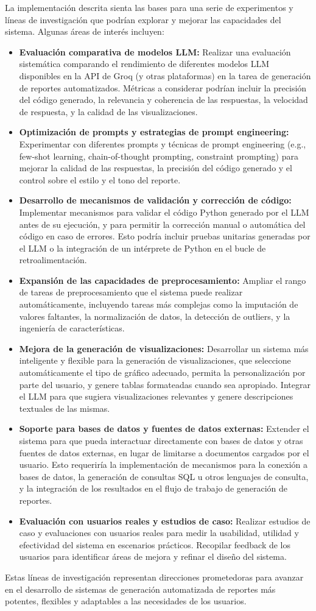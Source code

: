 La implementación descrita sienta las bases para una serie de experimentos y líneas de investigación que podrían explorar y mejorar las capacidades del sistema.  Algunas áreas de interés incluyen:

\begin{itemize}
	\item \textbf{Evaluación comparativa de modelos LLM:}  Realizar una evaluación sistemática comparando el rendimiento de diferentes modelos LLM disponibles en la API de Groq (y otras plataformas) en la tarea de generación de reportes automatizados.  Métricas a considerar podrían incluir la precisión del código generado,  la relevancia y coherencia de las respuestas,  la velocidad de respuesta,  y la calidad de las visualizaciones.
	\item \textbf{Optimización de prompts y estrategias de prompt engineering:}  Experimentar con diferentes prompts y técnicas de prompt engineering (e.g., few-shot learning, chain-of-thought prompting, constraint prompting) para mejorar la calidad de las respuestas,  la precisión del código generado y el control sobre el estilo y el tono del reporte.
	\item \textbf{Desarrollo de mecanismos de validación y corrección de código:}  Implementar mecanismos para validar el código Python generado por el LLM antes de su ejecución,  y para permitir la corrección manual o automática del código en caso de errores.  Esto podría incluir pruebas unitarias generadas por el LLM o la integración de un intérprete de Python en el bucle de retroalimentación.
	\item \textbf{Expansión de las capacidades de preprocesamiento:}  Ampliar el rango de tareas de preprocesamiento que el sistema puede realizar automáticamente,  incluyendo tareas más complejas como la imputación de valores faltantes,  la normalización de datos,  la detección de outliers,  y la ingeniería de características.
	\item \textbf{Mejora de la generación de visualizaciones:}  Desarrollar un sistema más inteligente y flexible para la generación de visualizaciones,  que seleccione automáticamente el tipo de gráfico adecuado,  permita la personalización por parte del usuario,  y genere tablas formateadas cuando sea apropiado.  Integrar el LLM para que sugiera visualizaciones relevantes y genere descripciones textuales de las mismas.
	\item \textbf{Soporte para bases de datos y fuentes de datos externas:}  Extender el sistema para que pueda interactuar directamente con bases de datos y otras fuentes de datos externas,  en lugar de limitarse a documentos cargados por el usuario.  Esto requeriría la implementación de mecanismos para la conexión a bases de datos,  la generación de consultas SQL u otros lenguajes de consulta,  y la integración de los resultados en el flujo de trabajo de generación de reportes.
	\item \textbf{Evaluación con usuarios reales y estudios de caso:}  Realizar estudios de caso y evaluaciones con usuarios reales para medir la usabilidad,  utilidad y efectividad del sistema en escenarios prácticos.  Recopilar feedback de los usuarios para identificar áreas de mejora y refinar el diseño del sistema.
\end{itemize}

Estas líneas de investigación representan direcciones prometedoras para avanzar en el desarrollo de sistemas de generación automatizada de reportes más potentes,  flexibles y adaptables a las necesidades de los usuarios.